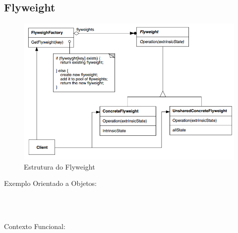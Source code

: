 \subsection{Flyweight}

\begin{figure}[htb]
	\caption{\label{fig_grafico}Estrutura do Flyweight}
	\begin{center}
	    \includegraphics[scale=0.5]{5_padroes-contexto-funcional/5.2_estruturais/5.2.6_flyweight/diagram.png}
	\end{center}
\end{figure}

Exemplo Orientado a Objetos:

\begin{lstlisting}[caption={Flyweight Orientado a Objetos},label=ooflyweight]



\end{lstlisting}

Contexto Funcional:


\begin{lstlisting}[caption={Flyweight Funcional},label=fpflyweight]
    

    
\end{lstlisting}